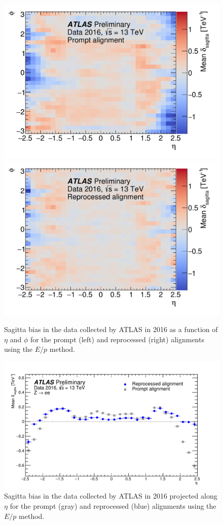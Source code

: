 \begin{figure}[htbp]
  \centering
  \includegraphics[width=.48\textwidth]{figs/alignment/eop/public_plot_map_prompt}
  \includegraphics[width=.48\textwidth]{figs/alignment/eop/public_plot_map_reprocessed}
  \caption{Sagitta bias in the  data collected by ATLAS in 2016 as a function of $\eta$ and $\phi$ for the prompt (left) and reprocessed (right) alignments using the $E/p$ method.}
  \label{fig:alignment_2016_sagitta_map}
\end{figure}

\begin{figure}[htbp]
  \centering
  \includegraphics[width=.6\textwidth]{figs/alignment/eop/public_plot_projection}
  \caption{Sagitta bias in the  data collected by ATLAS in 2016 projected along $\eta$ for the prompt (gray) and reprocessed (blue) alignments using the $E/p$ method.}
  \label{fig:alignment_2016_sagitta_projection}
\end{figure}

